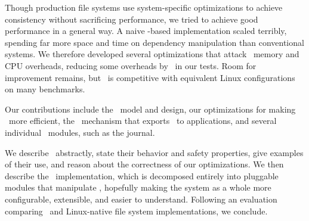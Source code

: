 Though production file systems use system-specific optimizations to achieve
 consistency without sacrificing performance, we tried to achieve good
 performance in a general way.
%
A naive \patch-based implementation scaled terribly,
 spending far more space and time on dependency manipulation than
 conventional systems.
%
We therefore developed several optimizations that attack \patch\ memory and
 CPU overheads, reducing some overheads by \patchoptundo\ in our tests. 
%
Room for improvement remains, but \Featherstitch\ is
 competitive with equivalent Linux configurations on many benchmarks.


Our contributions include the \patch\ model and design, our
 optimizations for making \patches\ more efficient,
 the \patchgroup\ mechanism that exports
 \patches\ to applications, and several individual \Kudos\ modules, such as
 the journal.


We describe \patches\ abstractly, state their behavior and safety
 properties, give examples of their use, and reason about the
 correctness of our optimizations.
%
We then describe the \Kudos\ implementation, which is decomposed
 entirely into pluggable modules that manipulate
 \patches, hopefully making the system as a whole more configurable,
 extensible, and easier to understand.
%
Following an evaluation comparing \Kudos\ and Linux-native file
 system implementations, we conclude.




\begin{comment}
%
Our benchmarks show that our optimizations can reduce the number of
 \patches\ \Kudos\ creates by \patchoptcount\ and the amount of undo data
 memory it allocates by \patchoptundo.
%
Our prototype is not yet as fast as we would like, but it is competitive
 with Linux on many of our benchmarks.
\end{comment}
